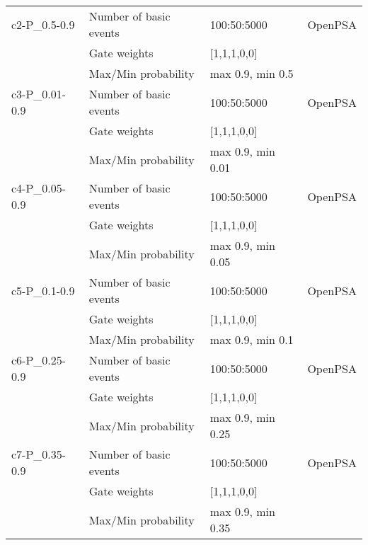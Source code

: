 \begin{longtable}{@{}llll@{}}
\midrule
c2-P\_0.5-0.9        & Number of basic events & 100:50:5000                   & OpenPSA \\
                     & Gate weights           & [1,1,1,0,0]                   &         \\
                     & Max/Min probability    & max 0.9, min 0.5              &         \\
\midrule
c3-P\_0.01-0.9       & Number of basic events & 100:50:5000                   & OpenPSA \\
                     & Gate weights           & [1,1,1,0,0]                   &         \\
                     & Max/Min probability    & max 0.9, min 0.01             &         \\
\midrule
c4-P\_0.05-0.9       & Number of basic events & 100:50:5000                   & OpenPSA \\
                     & Gate weights           & [1,1,1,0,0]                   &         \\
                     & Max/Min probability    & max 0.9, min 0.05             &         \\
\midrule
c5-P\_0.1-0.9        & Number of basic events & 100:50:5000                   & OpenPSA \\
                     & Gate weights           & [1,1,1,0,0]                   &         \\
                     & Max/Min probability    & max 0.9, min 0.1              &         \\
\midrule
c6-P\_0.25-0.9       & Number of basic events & 100:50:5000                   & OpenPSA \\
                     & Gate weights           & [1,1,1,0,0]                   &         \\
                     & Max/Min probability    & max 0.9, min 0.25             &         \\
\midrule
c7-P\_0.35-0.9       & Number of basic events & 100:50:5000                   & OpenPSA \\
                     & Gate weights           & [1,1,1,0,0]                   &         \\
                     & Max/Min probability    & max 0.9, min 0.35             &         \\
\bottomrule
\end{longtable}